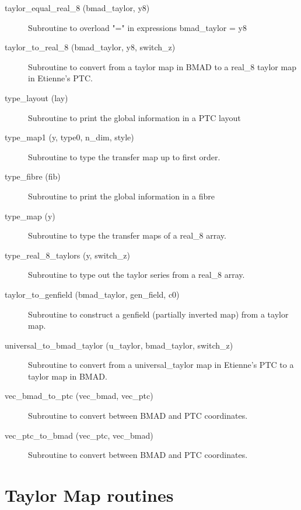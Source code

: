 \begin{description}
\item[taylor\_equal\_real\_8 (bmad\_taylor, y8)] \Newline
Subroutine to overload "=" in expressions bmad\_taylor = y8 

\item[taylor\_to\_real\_8 (bmad\_taylor, y8, switch\_z)] \Newline
Subroutine to convert from a taylor map in BMAD to a real\_8 taylor map in Etienne's PTC. 

\item[type\_layout (lay)] \Newline
Subroutine to print the global information in a PTC layout 

\item[type\_map1 (y, type0, n\_dim, style)] \Newline
Subroutine to type the transfer map up to first order. 

\item[type\_fibre (fib)] \Newline
Subroutine to print the global information in a fibre 

\item[type\_map (y)] \Newline
Subroutine to type the transfer maps of a real\_8 array. 

\item[type\_real\_8\_taylors (y, switch\_z)] \Newline
Subroutine to type out the taylor series from a real\_8 array. 

\item[taylor\_to\_genfield (bmad\_taylor, gen\_field, c0)] \Newline
Subroutine to construct a genfield (partially inverted map) from a taylor map. 

\item[universal\_to\_bmad\_taylor (u\_taylor, bmad\_taylor, switch\_z)] \Newline
Subroutine to convert from a universal\_taylor map in Etienne's PTC to a taylor map in BMAD. 

\item[vec\_bmad\_to\_ptc (vec\_bmad, vec\_ptc)] \Newline
Subroutine to convert between BMAD and PTC coordinates. 

\item[vec\_ptc\_to\_bmad (vec\_ptc, vec\_bmad)] \Newline
Subroutine to convert between BMAD and PTC coordinates. 

\end{description}

\section{Taylor Map routines}
\label{r:taylor}   

